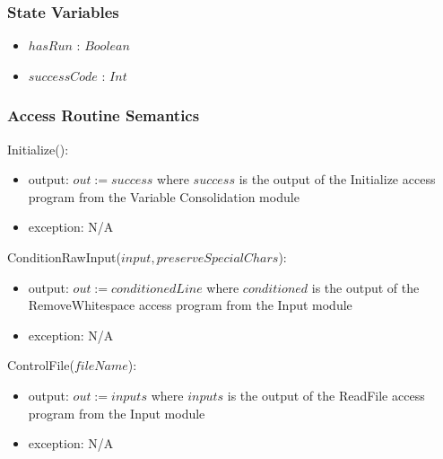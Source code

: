 \documentclass[12pt, titlepage]{article}
\begin{document}
\subsubsection{State Variables}

\begin{itemize}
	\item $hasRun$ : $Boolean$
	\item $successCode$ : $Int$
\end{itemize}

\newpage
\subsubsection{Access Routine Semantics}

\noindent Initialize():
\begin{itemize}
	\item output: $out := success$ where $success$ is the output of the 
	Initialize access program from the Variable Consolidation module
	\item exception: N/A
\end{itemize}

\noindent ConditionRawInput($input, preserveSpecialChars$):
\begin{itemize}
	\item output: $out := conditionedLine$ where $conditioned$ is the output of 
	the RemoveWhitespace access program from the Input module
	\item exception: N/A
\end{itemize}

\noindent ControlFile($fileName$):
\begin{itemize}
	\item output: $out := inputs$ where $inputs$ is the output of the 
	ReadFile access program from the Input module
	\item exception: N/A
\end{itemize}
\end{document}
